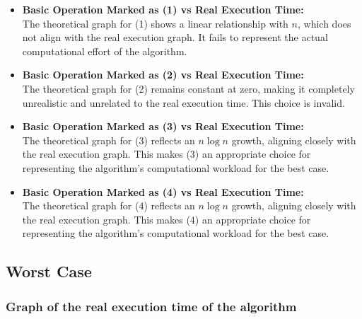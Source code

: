 \documentclass[11pt, oneside, a4paper]{article}
\begin{document}
    \begin{itemize}
    \item \textbf{Basic Operation Marked as (1) vs Real Execution Time:} \\
    The theoretical graph for (1) shows a linear relationship with \(n\), which does not align with the real execution graph. It fails to represent the actual computational effort of the algorithm.

    \item \textbf{Basic Operation Marked as (2) vs Real Execution Time:} \\
    The theoretical graph for (2) remains constant at zero, making it completely unrealistic and unrelated to the real execution time. This choice is invalid.

    \item \textbf{Basic Operation Marked as (3) vs Real Execution Time:} \\
    The theoretical graph for (3) reflects an \(n \log n\) growth, aligning closely with the real execution graph. This makes (3) an appropriate choice for representing the algorithm’s computational workload for the best case.

    \item \textbf{Basic Operation Marked as (4) vs Real Execution Time:} \\
    The theoretical graph for (4) reflects an \(n \log n\) growth, aligning closely with the real execution graph. This makes (4) an appropriate choice for representing the algorithm’s computational workload for the best case.
\end{itemize}




	\subsection{Worst Case}

	\subsubsection{Graph of the real execution time of the algorithm}
\end{document}
